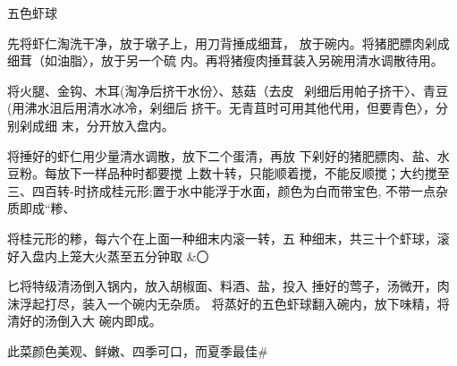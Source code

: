 \begin{recipe}{五色虾球}

\ingredients



\cooking

\step 先将虾仁淘洗干净，放于墩子上，用刀背捶成细茸， 放于碗内。将猪肥膘肉剁成细茸（如油脂〉，放于另一个硫 内。再将猪瘦肉捶茸装入另碗用清水调散待用。

\step 将火腿、金钩、木耳(淘净后挤干水份〉、慈菇（去皮~ 剁细后用帕子挤干〉、青豆(用沸水沮后用清水冰冷，剁细后 挤干。无青苴时可用其他代用，但要青色〉，分别剁成细 末，分开放入盘内。

将捶好的虾仁用少量清水调散，放下二个蛋清，再放 下剁好的猪肥膘肉、盐、水豆粉。每放下一样品种时都要搅 上数十转，只能顺着搅，不能反顺搅；大约搅至三、四百转-时挤成桂元形;置于水中能浮于水面，颜色为白而带宝色, 不带一点杂质即成“糁、

将桂元形的糁，每六个在上面一种细末内滚一转，五 种细末，共三十个虾球，滚好入盘内上笼大火蒸至五分钟取 &〇

匕将特级清汤倒入锅内，放入胡椒面、料酒、盐，投入 捶好的莺子，汤微开，肉沫浮起打尽，装入一个碗内无杂质。 将蒸好的五色虾球翻入碗内，放下味精，将清好的汤倒入大 碗内即成。

\notes

此菜颜色美观、鲜嫩、四季可口，而夏季最佳#

\end{recipe}


